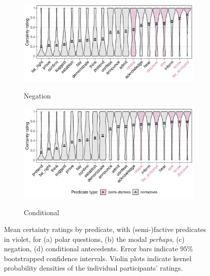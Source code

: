 \documentclass[a4paper,12pt,twoside]{article}
\begin{document}
\begin{figure}[h!]
            \vspace{-\baselineskip}
            \begin{subfigure}[t]{0.49\textwidth}
            \caption{Negation}
            \includegraphics[width = 1\linewidth]{negation-predicate-graph.pdf}
            \label{fig:op-pred-ratings-n}
            \end{subfigure}
            \begin{subfigure}[t]{0.49\textwidth}
            \caption{Conditional}
            \includegraphics[width = 1\linewidth]{conditional-predicate-graph.pdf}
            \label{fig:op-pred-ratings-c}
            \end{subfigure}

            \vspace{-\baselineskip}
            \caption{Mean certainty ratings by predicate, with (semi-)factive predicates in \textcolor{pred-fcv-color}{violet}, for (a) polar questions, (b) the modal \emph{perhaps}, (c) negation, (d) conditional antecedents. Error bars indicate $95\%$ bootstrapped confidence intervals. Violin plots indicate kernel probability densities of the individual participants’ ratings.}\label{fig:op-pred-ratings2}
        \end{figure}
\end{document}
